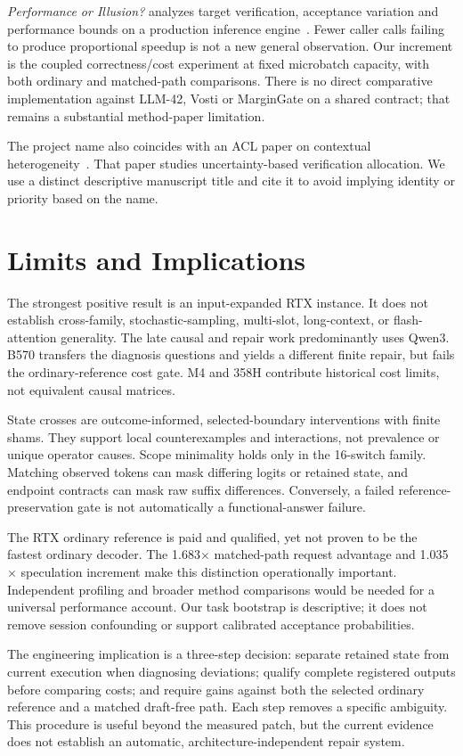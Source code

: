 \documentclass{article}
\begin{document}
\emph{Performance or Illusion?} analyzes target verification, acceptance variation and performance bounds on a production inference engine~\cite{illusion}. Fewer caller calls failing to produce proportional speedup is not a new general observation. Our increment is the coupled correctness/cost experiment at fixed microbatch capacity, with both ordinary and matched-path comparisons. There is no direct comparative implementation against LLM-42, Vosti or MarginGate on a shared contract; that remains a substantial method-paper limitation.

The project name also coincides with an ACL paper on contextual heterogeneity~\cite{aclheterospec}. That paper studies uncertainty-based verification allocation. We use a distinct descriptive manuscript title and cite it to avoid implying identity or priority based on the name.

\section{Limits and Implications}
The strongest positive result is an input-expanded RTX instance. It does not establish cross-family, stochastic-sampling, multi-slot, long-context, or flash-attention generality. The late causal and repair work predominantly uses Qwen3. B570 transfers the diagnosis questions and yields a different finite repair, but fails the ordinary-reference cost gate. M4 and 358H contribute historical cost limits, not equivalent causal matrices.

State crosses are outcome-informed, selected-boundary interventions with finite shams. They support local counterexamples and interactions, not prevalence or unique operator causes. Scope minimality holds only in the 16-switch family. Matching observed tokens can mask differing logits or retained state, and endpoint contracts can mask raw suffix differences. Conversely, a failed reference-preservation gate is not automatically a functional-answer failure.

The RTX ordinary reference is paid and qualified, yet not proven to be the fastest ordinary decoder. The 1.683$\times$ matched-path request advantage and 1.035$\times$ speculation increment make this distinction operationally important. Independent profiling and broader method comparisons would be needed for a universal performance account. Our task bootstrap is descriptive; it does not remove session confounding or support calibrated acceptance probabilities.

The engineering implication is a three-step decision: separate retained state from current execution when diagnosing deviations; qualify complete registered outputs before comparing costs; and require gains against both the selected ordinary reference and a matched draft-free path. Each step removes a specific ambiguity. This procedure is useful beyond the measured patch, but the current evidence does not establish an automatic, architecture-independent repair system.
\end{document}
